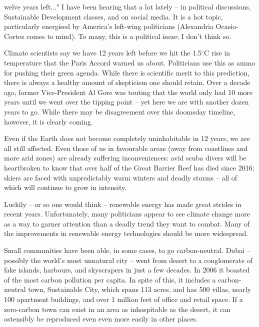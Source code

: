 \label{ch:renewable-energy-tech}


welve years left..." I have been hearing that a lot lately -- in
   political discussions, Sustainable Development classes, and on social
   media. It is a hot topic, particularly energised by America's left-wing
   politicians (Alexandria Ocasio-Cortez comes to mind). To many, this is
   a political issue; I don't think so.

   Climate scientists say we have 12 years left before we hit the
   1.5$^{\circ}$C rise in temperature that the Paris Accord warned us
   about. Politicians use this as ammo for pushing their green
   agenda. While there is scientific merit to this prediction, there is
   always a healthy amount of skepticism one should retain. Over a decade
   ago, former Vice-President Al Gore was touting that the world only had
   10 more years until we went over the tipping point -- yet here we are
   with another dozen years to go. While there may be disagreement over
   this doomsday timeline, however, it is clearly coming.

   Even if the Earth does not become completely uninhabitable in
   12 years, we are all still affected. Even those of us in favourable
   areas (away from coastlines and more arid zones) are already suffering
   inconveniences: avid scuba divers will be heartbroken to know that over
   half of the Great Barrier Reef has died since 2016; skiers are faced
   with unpredictably warm winters and deadly storms -- all of which will
   continue to grow in intensity.

   Luckily -- or so one would think -- renewable energy has made great
   strides in recent years. Unfortunately, many politicians appear to see
   climate change more as a way to garner attention than a deadly trend
   they want to combat. Many of the improvements in renewable energy
   technologies should be more widespread.

   Small communities have been able, in some cases, to go carbon-neutral.
   Dubai -- possibly the world's most unnatural city -- went from desert
   to a conglomerate of fake islands, harbours, and skyscrapers in just a
   few decades. In 2006 it boasted of the most carbon pollution per
   capita. In spite of this, it includes a carbon-neutral town,
   Sustainable City, which spans 113 acres, and has 500 villas, nearly 100
   apartment buildings, and over 1 million feet of office and retail
   space. If a zero-carbon town can exist in an area as inhospitable as
   the desert, it can ostensibly be reproduced even even more easily in
   other places.

